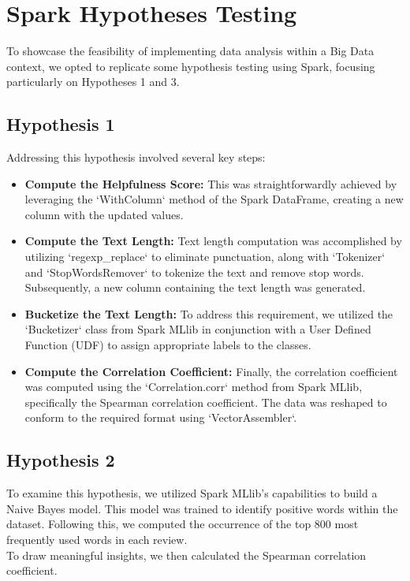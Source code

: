\section{Spark Hypotheses Testing}
To showcase the feasibility of implementing data analysis within a Big Data context, we opted to replicate some hypothesis testing using
Spark, focusing particularly on Hypotheses 1 and 3.

\subsection*{Hypothesis 1}
Addressing this hypothesis involved several key steps:

\begin{itemize}[leftmargin=*, noitemsep]
    \item \textbf{Compute the Helpfulness Score:}
          This was straightforwardly achieved by leveraging the `WithColumn` method of the Spark DataFrame, creating a new column with the updated values.

    \item \textbf{Compute the Text Length:}
          Text length computation was accomplished by utilizing `regexp\_replace` to eliminate punctuation, along with `Tokenizer` and `StopWordsRemover`
          to tokenize the text and remove stop words. Subsequently, a new column containing the text length was generated.

    \item \textbf{Bucketize the Text Length:}
          To address this requirement, we utilized the `Bucketizer` class from Spark MLlib in conjunction with a User Defined Function (UDF) to
          assign appropriate labels to the classes.

    \item \textbf{Compute the Correlation Coefficient:}
          Finally, the correlation coefficient was computed using the `Correlation.corr` method from Spark MLlib, specifically the Spearman correlation
          coefficient. The data was reshaped to conform to the required format using `VectorAssembler`.

\end{itemize}

\subsection*{Hypothesis 2}
To examine this hypothesis, we utilized Spark MLlib's capabilities to build a Naive Bayes model.
This model was trained to identify positive words within the dataset.
Following this, we computed the occurrence of the top 800 most frequently used words in each review.\\
To draw meaningful insights, we then calculated the Spearman correlation coefficient.
